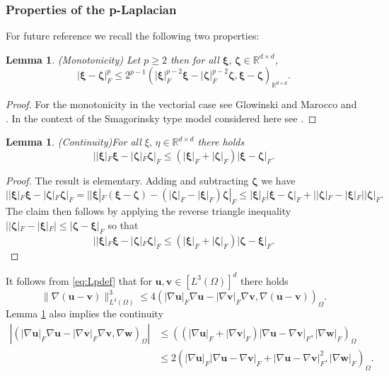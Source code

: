 \documentclass[10pt]{amsart}
\numberwithin{equation}{section}
\newtheorem{lemma}[theorem]{Lemma}
\theoremstyle{definition}
\theoremstyle{remark}
\newcommand{\bxi}{\bld{\xi}}
\renewcommand{\(}{\bigl(}
\renewcommand{\)}{\bigr)}
\newcommand{\bld}[1]{\boldsymbol{#1}}
\newcommand{\bv}{\bld{v}}
\newcommand{\bw}{\bld{w}}
\newcommand{\bu}{\bld{u}}
\newcommand{\bzeta}{\bld{\zeta}}
\begin{document}
\subsubsection{Properties of the p-Laplacian}
For future reference we recall the following two properties:
\begin{lemma}(Monotonicity)
Let $p \ge 2$ then for all $\bxi,
\,\bzeta \in \mathbb{R}^{d\times d}$,
\begin{equation}\label{eq:monotone}
|\bxi - \bzeta|_F^p \leq 2^{p-1} (|\bxi|_F^{p-2} \bxi - |\bzeta|_F^{p-2}
\bzeta, \bxi-\bzeta)_{\mathbb{R}^{d\times d}}.
\end{equation}
\end{lemma}
\begin{proof}
For the monotonicity in the vectorial case see Glowinski and Marocco \cite[Lemma 5.1]{GM75} and \cite[Lemma
3.30]{DEGGH18}. In the context of the
Smagorinsky type model considered here see \cite[Lemma 8.88]{John16}.
\end{proof}
\begin{lemma}(Continuity)\label{lem:cont}
For all $\xi,\, \eta \in \mathbb{R}^{d\times d}$ there holds
\begin{equation}\label{eq:cont1}
||\bxi|_F \bxi - |\bzeta|_F \bzeta|_F \leq  (|\bxi|_F + |\bzeta|_F) |\bxi -\bzeta|_F.
\end{equation}
\end{lemma}
\begin{proof}
The result is elementary. Adding and subtracting $\bzeta$ we have
\[
||\bxi|_F \bxi - |\bzeta|_F \bzeta|_F = ||\bxi|_F (\bxi - \bzeta) -
(|\bzeta|_F  -|\bxi|_F) \bzeta|_F \leq |\bxi|_F|\bxi - \bzeta|_F +
||\bzeta|_F  -|\bxi|_F| |\bzeta|_F. 
\]
The claim then follows by applying the reverse triangle inequality
$||\bzeta|_F  -|\bxi|_F| \leq |\bzeta  -\bxi|_F$ so that
\[
||\bxi|_F \bxi - |\bzeta|_F \bzeta|_F \leq (|\bxi|_F+|\bzeta|_F) |\bzeta  -\bxi|_F.
\]
\end{proof}
%
It follows from \eqref{eq:Lpdef} that for $\bu, \bv \in [L^3(\Omega)]^d$ there holds
\begin{equation}\label{eq:monotone_L3}
\|\nabla (\bu - \bv)\|^3_{L^3(\Omega)} \leq 4 (|\nabla \bu|_F \nabla
\bu - |\nabla \bv|_F \nabla
\bv,\nabla (\bu - \bv))_\Omega.
\end{equation}
Lemma \ref{lem:cont} also implies the continuity
\begin{align}\nonumber
|(|\nabla \bu|_F \nabla \bu - |\nabla \bv|_F \nabla \bv, \nabla
\bw)_\Omega | &\leq ((|\nabla \bu|_F+|\nabla \bv|_F) |\nabla \bu -\nabla
\bv|_F, |\nabla \bw|_F)_\Omega \\ 
\label{eq:continuous}
&\leq 2 (|\nabla \bu|_F |\nabla \bu -\nabla \bv|_F+|\nabla \bu -\nabla \bv|^2_F, |\nabla \bw|_F)_\Omega.
\end{align}
\end{document}
